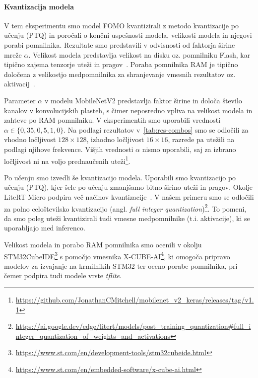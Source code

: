 \documentclass[a4paper,twoside,openright,12pt,slovene]{book}
\begin{document}
            \paragraph{Kvantizacija modela} \label{sct:eir-eksperimenti-kvantizacija}

            V tem eksperimentu smo model FOMO kvantizirali z metodo
            kvantizacije po učenju (PTQ) in poročali o končni uspešnosti
            modela, velikosti modela in njegovi porabi pomnilnika. Rezultate
            smo predstavili v odvisnosti od faktorja širine mreže $\alpha$.
            Velikost modela predstavlja velikost na disku oz. pomnilniku Flash,
            kar tipično zajema tenzorje uteži in pragov~\cite{src:litertmicro}.
            Poraba pomnilnika RAM je tipično določena z velikostjo
            medpomnilnika za shranjevanje vmesnih rezultatov oz.
            aktivacij~\cite{src:litertmicro}.

            Parameter \(\alpha\) v modelu MobileNetV2 predstavlja faktor širine
            in določa število kanalov v konvolucijskih plasteh, s čimer
            neposredno vpliva na velikost modela in zahteve po RAM pomnilniku.
            V eksperimentih smo uporabili vrednosti \(\alpha \in \{0{,}35,
            0{,}5, 1{,}0\}\). Na podlagi rezultatov v~\ref{tab:res-combos}
            smo se odločili za vhodno ločljivost \(128 \times 128\), izhodno
            ločljivost \(16 \times 16\), razrede pa utežili na podlagi njihove
            frekvence. Višjih vrednosti $\alpha$ nismo uporabili, saj za
            izbrano ločljivost ni na voljo prednaučenih
            uteži\footnote{\url{https://github.com/JonathanCMitchell/mobilenet_v2_keras/releases/tag/v1.1}}.
            
            Po učenju smo izvedli še kvantizacijo modela. Uporabili smo
            kvantizacijo po učenju (PTQ), kjer šele po učenju zmanjšamo bitno
            širino uteži in pragov. Okolje LiteRT Micro podpira več načinov
            kvantizacije~\cite{src:litertmicro,
            src:david2021tensorflowlitemicro}. V našem primeru smo se odločili
            za polno celoštevilsko kvantizacijo (angl. \emph{full integer
            quantization})\footnote{\url{https://ai.google.dev/edge/litert/models/post_training_quantization\#full_integer_quantization_of_weights_and_activations}}.
            To pomeni, da smo poleg uteži kvantizirali tudi vmesne
            medpomnilnike (t.i. aktivacije), ki se uporabljajo med inferenco.
            
            Velikost modela in porabo RAM pomnilnika smo ocenili v okolju
            STM32CubeIDE\footnote{\url{https://www.st.com/en/development-tools/stm32cubeide.html}}
            s pomočjo vmesnika
            X-CUBE-AI\footnote{\url{https://www.st.com/en/embedded-software/x-cube-ai.html}},
            ki omogoča pripravo modelov za izvajanje na krmilnikih STM32 ter
            oceno porabe pomnilnika, pri čemer podpira tudi modele vrste
            \textit{tflite}.
\end{document}

